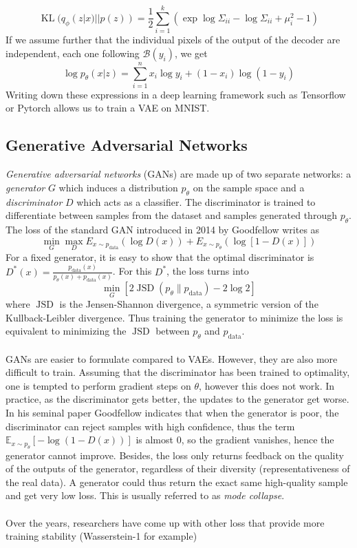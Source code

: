 \documentclass{article}
\theoremstyle{definition}
\theoremstyle{lemma}
\theoremstyle{theorem}
\DeclareMathOperator*{\data}{\text{data}}
\DeclareMathOperator*{\kl}{\text{KL}}
\DeclareMathOperator*{\jsd}{\text{JSD}}
\begin{document}
$$\kl(q_\phi(z|x)||p(z)) = \frac 12 \sum_{i=1}^k \left(\exp \log \Sigma_{ii} - \log \Sigma_{ii} + \mu_i^2 - 1 \right)$$
If we assume further that the individual pixels of the output of the decoder are independent, each one following $\mathcal B(y_i)$, we get
$$\log p_\theta(x|z) = \sum_{i=1}^n x_i \log y_i + (1-x_i) \log(1-y_i) $$
Writing down these expressions in a deep learning framework such as Tensorflow or Pytorch allows us to train a VAE on MNIST.

\subsection{Generative Adversarial Networks}
\textit{Generative adversarial networks} (GANs) are made up of two separate networks: a \textit{generator} $G$ which induces a distribution $p_\theta$ on the sample space and a \textit{discriminator} $D$ which acts as a classifier. The discriminator is trained to differentiate between samples from the dataset and samples generated through $p_\theta$. The loss of the standard GAN introduced in 2014 by Goodfellow writes as 
$$\min_G \max_D E_{x\sim p_{\data}}(\log D(x)) +  E_{x\sim p_{\theta}}(\log[1-D(x)])$$
For a fixed generator, it is easy to show that the optimal discriminator is $\displaystyle D^*(x) = \frac{p_{\data}(x)}{p_\theta(x) + p_{\data}(x)}$. For this $D^*$, the loss turns into $$\min_G \left[ 2\jsd(p_\theta \| p_{\data})  - 2\log 2 \right]$$
where $\jsd$ is the Jensen-Shannon divergence, a symmetric version of the Kullback-Leibler divergence. Thus training the generator to minimize the loss is equivalent to minimizing the $\jsd$ between $p_\theta$ and $p_{\data}$.\\
\\
GANs are easier to formulate compared to VAEs. However, they are also more difficult to train. Assuming that the discriminator has been trained to optimality, one is tempted to perform gradient steps on $\theta$, however this does not work. In practice, as the discriminator gets better, the updates to the generator get worse. In his seminal paper Goodfellow indicates that when the generator is poor, the discriminator can reject samples with high confidence, thus the term $\mathbb{E}_{x \sim p_\theta} \left[ -\log \left(1-D(x)\right) \right]$ is almost $0$, so the gradient vanishes, hence the generator cannot improve. Besides, the loss only returns feedback on the quality of the outputs of the generator, regardless of their diversity (representativeness of the real data). A generator could thus return the exact same high-quality sample and get very low loss. This is usually referred to as \textit{mode collapse}. \\
\\
Over the years, researchers have come up with other loss that provide more training stability (Wasserstein-1 for example)
\end{document}
